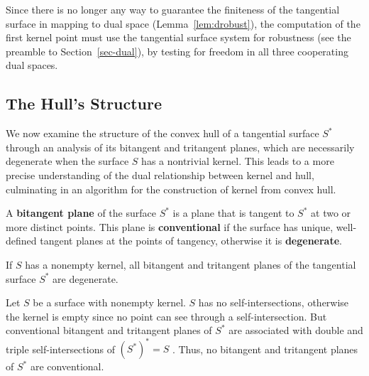 \documentclass{elsart}
\begin{document}
Since there is no longer any way to guarantee the finiteness of the tangential surface
in mapping to dual space (Lemma~\ref{lem:drobust}),
the computation of the first kernel point must use the tangential surface system 
for robustness (see the preamble to Section~\ref{sec-dual}),
by testing for freedom in all three cooperating dual spaces.


\subsection{The Hull's Structure}
\label{sec:cusp}

We now examine the structure of the convex hull of a tangential
surface $S^*$ through an analysis of its bitangent and tritangent planes,
which are necessarily degenerate when the surface $S$ has a nontrivial kernel.
This leads to a more precise understanding of the 
dual relationship between kernel and hull, culminating in an
algorithm for the construction of kernel from convex hull.

\begin{defn2}
A {\bf bitangent plane} of the surface $S^*$ is a plane that
is tangent to $S^*$ at two or more distinct points.
This plane is {\bf conventional} if the surface has unique, well-defined 
tangent planes at the points of tangency,
otherwise it is {\bf degenerate}.
\end{defn2}

\begin{lemma}
If $S$ has a nonempty kernel, all bitangent and tritangent planes 
of the tangential surface $S^*$ are degenerate.
\end{lemma}
\prf
Let $S$ be a surface with nonempty kernel.
$S$ has no self-intersections, otherwise the kernel is empty
since no point can see through a self-intersection.
But conventional bitangent and tritangent planes of $S^*$ are associated
with double and triple self-intersections of $(S^*)^* = S$ \cite{jj02,jj03tangsurf}.
Thus, no bitangent and tritangent planes of $S^*$ are conventional.
\QED
\end{document}
